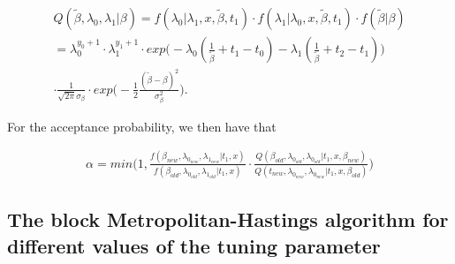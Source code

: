 \begin{align}
    Q(\widetilde{\beta}, \lambda_0, \lambda_1| \beta) = f(\lambda_0| \lambda_1, x, \widetilde{\beta}, t_1)\cdot f(\lambda_1| \lambda_0, x, \widetilde{\beta}, t_1)\cdot f(\widetilde{\beta}| \beta) \nonumber \\
    = \lambda_0^{y_0 + 1} \cdot \lambda_1^{y_1 + 1} \cdot exp \Big( -\lambda_0(\frac{1}{\widetilde{\beta}} + t_1 - t_0) - \lambda_1(\frac{1}{\widetilde{\beta}} + t_2 - t_1)  \Big)  \nonumber \\ \cdot \frac{1}{\sqrt{2 \pi}\sigma_{\beta} } \cdot exp \Big(  -\frac{1}{2} \frac{(\widetilde{\beta}-\beta)^2}{\sigma_{\beta}^2} \Big).
\end{align}




For the acceptance probability, we then have that 

\begin{align}
    \alpha = min \Bigg(1,  \frac{
    f(\beta_{new}, \lambda_{0_{new}}, \lambda_{1_{new}}|t_1, x)}{f(\beta_{old}, \lambda_{0_{old}}, \lambda_{1_{old}}|t_1, x)}
    \cdot 
    \frac{Q(\beta_{old}, \lambda_{0_{old}}, \lambda_{0_{old}} | t_1, x, \beta_{new})}{Q(t_{new}, \lambda_{0_{new}}, \lambda_{0_{new}} | t_1, x, \beta_{old})} \Bigg) %
\end{align}





\subsection{The block Metropolitan-Hastings algorithm for different values of the tuning parameter}


